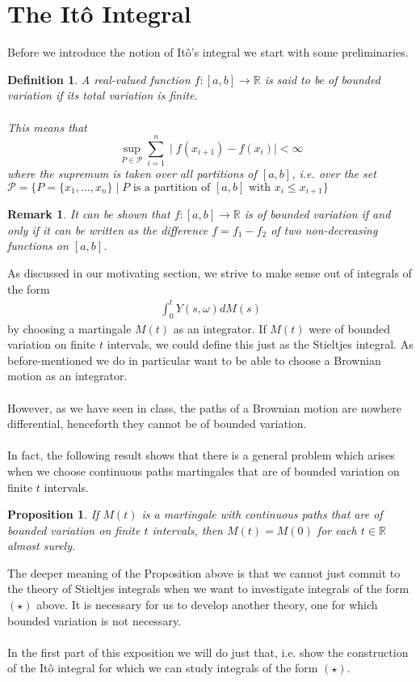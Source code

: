\documentclass[11pt,a4paper, final]{article}
\newtheorem{prop}{Proposition}[section]
\newtheorem{defn}{Definition}[section]
\newtheorem{rem}{Remark}[defn]
\begin{document}
\section{The Itô Integral}
Before we introduce the notion of Itô's integral we start with some preliminaries.
\begin{defn}
A real-valued function $f: [a,b] \rightarrow \mathbb{R}$ is said to be of \textit{bounded variation} if its total variation is finite.\\
\\ This means that 
$$ \sup_{P \in \mathcal{P}} \sum \limits_{i=1}^n \mid f(x_{i+1})-f(x_i)\mid < \infty $$
where the supremum is taken over all partitions of $[a,b]$, i.e. over the set \\  $\mathcal{P}= \lbrace P = \lbrace x_1 , \dots , x_n \rbrace \mid P \text{ is a partition of $[a,b]$ with $x_i \leq x_{i+1}$} \rbrace$
\end{defn}
\begin{rem} \label{boundedvarincreasing} It can be shown that $f: [a,b] \to \mathbb{R}$ is of bounded variation if and only if it can be written as the difference $f=f_1-f_2$ of two non-decreasing functions on $[a,b]$.
\end{rem}
\noindent As discussed in our motivating section, we strive to make sense out of integrals of the form 
\begin{align*}
\int_0^t Y(s, \omega) dM(s) \tag{$\star$} 
\end{align*} by choosing a martingale $M(t)$ as an integrator. If $M(t)$ were of bounded variation on finite $t$ intervals, we could define this just as the Stieltjes integral. As before-mentioned we do in particular want to be able to choose a Brownian motion as an integrator. 
\\\\
However, as we have seen in class, the paths of a Brownian motion are nowhere differential, henceforth they cannot be of bounded variation. \\
\\
In fact, the following result shows that there is a general problem which arises when we choose continuous paths martingales that are of bounded variation on finite $t$ intervals.
\begin{prop}  \label{first Prop}
If $M(t)$ is a martingale with continuous paths that are of bounded variation on finite $t$ intervals, then $M(t) = M(0)$ for each $t \in \mathbb{R}$ almost surely.
\end{prop}
\noindent The deeper meaning of the Proposition above is that we cannot just commit to the theory of Stieltjes integrals when we want to investigate integrals of the form $(\star)$ above. It is necessary for us to develop another theory, one for which bounded variation is not necessary. 
\\\\
In the first part of this exposition we will do just that, i.e. show the construction of the Itô integral for which we can study integrals of the form $(\star)$. 
\newpage 
\end{document}
